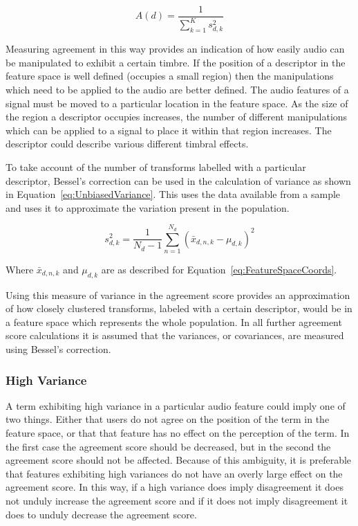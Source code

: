 			\begin{equation}
				A(d) = \frac{1}{\sum_{k = 1}^{K} s_{d,k}^{2}}
				\label{eq:ReciprocalOfSumAgreement}
			\end{equation}

			Measuring agreement in this way provides an indication of how easily audio can be manipulated to
			exhibit a certain timbre. If the position of a descriptor in the feature space is well defined
			(occupies a small region) then the manipulations which need to be applied to the audio are better
			defined. The audio features of a signal must be moved to a particular location in the feature
			space. As the size of the region a descriptor occupies increases, the number of different
			manipulations which can be applied to a signal to place it within that region increases. The
			descriptor could describe various different timbral effects.

			To take account of the number of transforms labelled with a particular descriptor, Bessel's
			correction can be used in the calculation of variance as shown in
			Equation~\ref{eq:UnbiasedVariance}. This uses the data available from a sample and uses it to
			approximate the variation present in the population.

			\begin{equation}
				s_{d,k}^{2} = \frac{1}{N_{d} - 1} \sum_{n = 1}^{N_{d}} (\bar{x}_{d,n,k} - \mu_{d,k})^{2}
				\label{eq:UnbiasedVariance}
			\end{equation}

			Where $\bar{x}_{d,n,k}$ and $\mu_{d,k}$ are as described for Equation~\ref{eq:FeatureSpaceCoords}.

			Using this measure of variance in the agreement score provides an approximation of how closely
			clustered transforms, labeled with a certain descriptor, would be in a feature space which
			represents the whole population. In all further agreement score calculations it is assumed that the
			variances, or covariances, are measured using Bessel's correction.

		\subsubsection*{High Variance}
			A term exhibiting high variance in a particular audio feature could imply one of two things. Either
			that users do not agree on the position of the term in the feature space, or that that feature has
			no effect on the perception of the term. In the first case the agreement score should be decreased,
			but in the second the agreement score should not be affected. Because of this ambiguity, it is
			preferable that features exhibiting high variances do not have an overly large effect on the
			agreement score.  In this way, if a high variance does imply disagreement it does not unduly
			increase the agreement score and if it does not imply disagreement it does to unduly decrease the
			agreement score.
			
